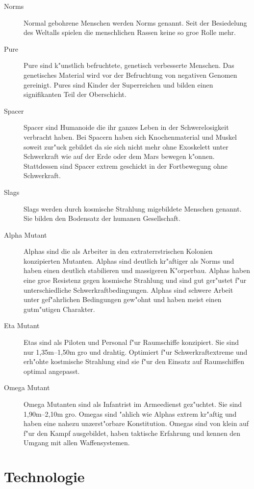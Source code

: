 \begin{appendices}
\begin{description}
\item [Norms] Normal gebohrene Menschen werden Norms genannt. Seit der Besiedelung des Weltalls spielen die
      menschlichen Rassen keine so gro\3e Rolle mehr.
\item [Pure] Pure sind k"unstlich befruchtete, genetisch verbesserte Menschen. Das genetisches Material wird vor der
      Befruchtung von negativen Genomen gereinigt. Pures sind Kinder der Superreichen und bilden einen signifikanten Teil der Oberschicht.
\item [Spacer] Spacer sind Humanoide die ihr ganzes Leben in der Schwerelosigkeit verbracht haben. Bei Spacern haben sich
      Knochenmaterial und Muskel soweit zur"uck gebildet da\3 sie sich nicht mehr ohne Exoskelett unter Schwerkraft wie auf der Erde oder dem Mars bewegen k"onnen. Stattdessen sind Spacer extrem geschickt in der Fortbewegung ohne Schwerkraft.
\item [Slags] Slags werden durch kosmische Strahlung mi\3gebildete Menschen genannt. Sie bilden den Bodensatz der
      humanen Gesellschaft.
\item [Alpha Mutant] Alphas sind die als Arbeiter in den extraterrstrischen Kolonien konzipierten Mutanten.
      Alphas sind deutlich kr"aftiger als Norms und haben einen deutlich stabilieren und massigeren K"orperbau. Alphas haben eine gro\3e Resistenz gegen kosmische Strahlung und sind gut ger"ustet f"ur unterschiedliche Schwerkraftbedingungen. Alphas sind schwere Arbeit unter gef"ahrlichen Bedingungen gew"ohnt und haben meist einen gutm"utigen Charakter.
\item [Eta Mutant] Etas sind als Piloten und Personal f"ur Raumschiffe konzipiert. Sie sind nur 1,35m--1,50m gro\3
      und drahtig. Optimiert f"ur Schwerkraftextreme und erh"ohte kostmische Strahlung sind sie f"ur den Einsatz auf Raumschiffen optimal angepasst.
\item [Omega Mutant] Omega Mutanten sind als Infantrist im Armeedienst gez"uchtet. Sie sind 1,90m--2,10m gro\3.
      Omegas sind "ahlich wie Alphas extrem kr"aftig und haben eine nahezu unzerst"orbare Konstitution. Omegas sind von klein auf f"ur den Kampf ausgebildet, haben taktische Erfahrung und kennen den Umgang mit allen Waffensystemen.
\end{description}

\section{Technologie}


\end{appendices}
